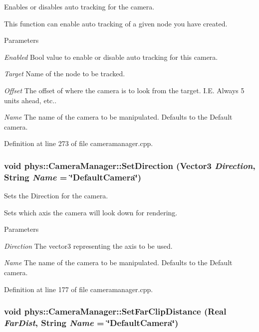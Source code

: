 Enables or disables auto tracking for the camera. 

This function can enable auto tracking of a given node you have created. 
\begin{DoxyParams}{Parameters}
\item[{\em Enabled}]Bool value to enable or disable auto tracking for this camera. \item[{\em Target}]Name of the node to be tracked. \item[{\em Offset}]The offset of where the camera is to look from the target. I.E. Always 5 units ahead, etc.. \item[{\em Name}]The name of the camera to be manipulated. Defaults to the Default camera. \end{DoxyParams}


Definition at line 273 of file cameramanager.cpp.

\hypertarget{classphys_1_1CameraManager_aaee96e189230c020d6f7b6fe439e0812}{
\subsubsection[{SetDirection}]{\setlength{\rightskip}{0pt plus 5cm}void phys::CameraManager::SetDirection ({\bf Vector3} {\em Direction}, \/  {\bf String} {\em Name} = {\ttfamily \char`\"{}DefaultCamera\char`\"{}})}}
\label{d9/d91/classphys_1_1CameraManager_aaee96e189230c020d6f7b6fe439e0812}


Sets the Direction for the camera. 

Sets which axis the camera will look down for rendering. 
\begin{DoxyParams}{Parameters}
\item[{\em Direction}]The vector3 representing the axis to be used. \item[{\em Name}]The name of the camera to be manipulated. Defaults to the Default camera. \end{DoxyParams}


Definition at line 177 of file cameramanager.cpp.

\hypertarget{classphys_1_1CameraManager_a809e4e31a9ad42afd620e95508ad78d7}{
\subsubsection[{SetFarClipDistance}]{\setlength{\rightskip}{0pt plus 5cm}void phys::CameraManager::SetFarClipDistance ({\bf Real} {\em FarDist}, \/  {\bf String} {\em Name} = {\ttfamily \char`\"{}DefaultCamera\char`\"{}})}}
\label{d9/d91/classphys_1_1CameraManager_a809e4e31a9ad42afd620e95508ad78d7}


